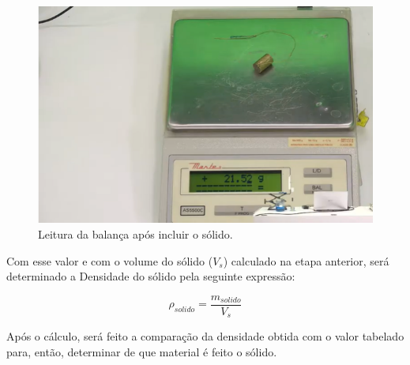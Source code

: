\begin{figure}[H]
    \centering
    \includegraphics[scale=0.8]{images/Experimento2.3.png}
    \caption{ Leitura da balança após incluir o sólido.}
\end{figure}

Com esse valor e com o volume do sólido ($V_s$) calculado na etapa anterior, será determinado a Densidade do sólido pela seguinte expressão:

\[\rho_{solido} = \frac{m_{solido}}{V_s} \]

Após o cálculo, será feito a comparação da densidade obtida com o valor tabelado para, então, determinar de que material é feito o sólido.

